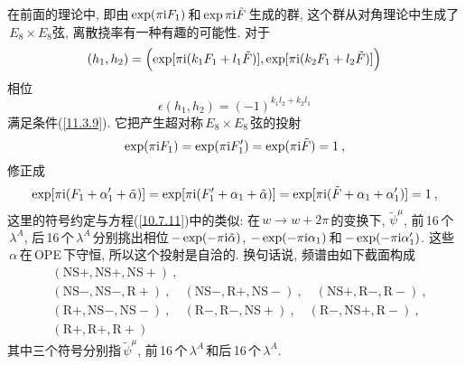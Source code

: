 在前面的理论中, 即由$\,\exp(\pi\mathrm{i} F_{1})\,$和$\,\exp{\pi\mathrm{i}\tilde{F}}\,$生成的群, 这个群从对角理论中生成了$\,E_{8}\times E_{8}$弦, 离散挠率有一种有趣的可能性. 对于
\begin{equation}
   (h_{1},h_{2})= \Bigl(\exp[\pi\mathrm{i}(k_{1}F_{1}+l_{1}\tilde{F})],
   \exp[\pi\mathrm{i}(k_{2}F_{1}+l_{2}\tilde{F})]\Bigr) \label{11.3.12} 
\end{equation}
相位
\begin{equation}
    \epsilon(h_{1},h_{2})= (-1)^{k_{1}l_{2}+k_{2}l_{1}} \label{11.3.13}
\end{equation}
满足条件(\ref{11.3.9}). 它把产生超对称$\,E_{8}\times E_{8}\,$弦的投射
\begin{equation}
    \exp(\pi\mathrm{i} F_{1})=\exp(\pi\mathrm{i} F_{1}^{\prime}) = \exp(\pi\mathrm{i}\tilde{F})=1\:, \label{11.3.14}
\end{equation}
修正成
\begin{equation}
    \exp[\pi\mathrm{i} (F_{1}+\alpha_{1}^{\prime}+\tilde{\alpha})]
    =\exp[\pi\mathrm{i}(F_{1}^{\prime}+\alpha_{1}+\tilde{\alpha})] 
    = \exp[\pi\mathrm{i}(\tilde{F}+\alpha_{1}+\alpha_{1}^{\prime})]=1\:, \label{11.3.15}
\end{equation}
这里的符号约定与方程(\ref{10.7.11})中的类似: 在$\,w\to w+2\pi\,$的变换下, $\tilde{\psi}^{\mu}$, 前\,16\,个$\,\lambda^{A}$, 后\,16\,个$\,\lambda^{A}\,$分别挑出相位$\,-\exp(-\pi\mathrm{i}\tilde{\alpha})$, $-\exp(-\pi\mathrm{i}\alpha_{1})\,$和$\,-\exp(-\pi\mathrm{i}\alpha_{1}^{\prime})$. 这些$\,\alpha\,$在\,OPE\,下守恒, 所以这个投射是自洽的. 换句话说, 频谱由如下截面构成
\begin{align*}
    &(\mathrm{NS}+,\mathrm{NS}+,\mathrm{NS}+) \:, \\
    &(\mathrm{NS}-,\mathrm{NS}-,\mathrm{R}+)\:,\quad (\mathrm{NS}-,\mathrm{R}+,\mathrm{NS}-)\:,\quad
    (\mathrm{NS}+,\mathrm{R}-,\mathrm{R}-)\:, \\
    &(\mathrm{R}+,\mathrm{NS}-,\mathrm{NS}-)\:,\quad (\mathrm{R}-,\mathrm{R}-,\mathrm{NS}+)\:, \quad
    (\mathrm{R}-,\mathrm{NS}+,\mathrm{R}-) \:, \\
    &(\mathrm{R}+,\mathrm{R}+,\mathrm{R}+) 
\end{align*}
其中三个符号分别指$\,\tilde{\psi}^{\mu}$, 前\,16\,个$\,\lambda^{A}\,$和后\,16\,个$\,\lambda^{A}$.

